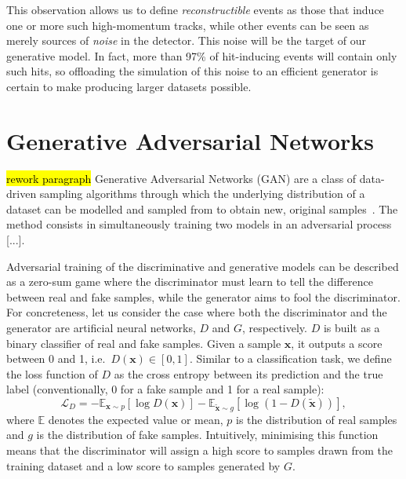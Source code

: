 This observation allows us to define \emph{reconstructible} events as those that induce one or more such high-momentum tracks, while other events can be seen as merely sources of \emph{noise} in the detector. This noise will be the target of our generative model. In fact, more than 97\% of hit-inducing events will contain only such hits, so offloading the simulation of this noise to an efficient generator is certain to make producing larger datasets possible.





\section{Generative Adversarial Networks}
\hl{rework paragraph}
Generative Adversarial Networks (GAN) are a class of data-driven sampling algorithms through which the underlying distribution of a dataset can be modelled and sampled from to obtain new, original samples~\cite{goodfellow_generative_2014}. %
The method consists in simultaneously training two models in an adversarial process [...].

Adversarial training of the discriminative and generative models can be described as a zero-sum game where the discriminator must learn to tell the difference between real and fake samples, while the generator aims to fool the discriminator.
For concreteness, let us consider the case where both the discriminator and the generator are artificial neural networks, $D$ and $G$, respectively. $D$ is built as a binary classifier of real and fake samples. Given a sample $\mathbf{x}$, it outputs a score between 0 and 1, i.e.\ $D(\mathbf{x}) \in [0, 1]$. Similar to a classification task, we define the loss function of $D$ as the cross entropy between its prediction and the true label (conventionally, 0 for a fake sample and 1 for a real sample):
\begin{equation}\label{eq:D_loss}
    \mathcal{L}_D = 
    -\mathbb{E}_{\mathbf{x} \sim p} [ \log D(\mathbf{x}) ] -
    \mathbb{E}_{\tilde{\mathbf{x}} \sim g} [ \log( 1 - D(\tilde{\mathbf{x}}) )],
\end{equation}
where $\mathbb{E}$ denotes the expected value or mean, $p$ is the distribution of real samples and $g$ is the distribution of fake samples.
Intuitively, minimising this function means that the discriminator will assign a high score to samples drawn from the training dataset and a low score to samples generated by $G$.

